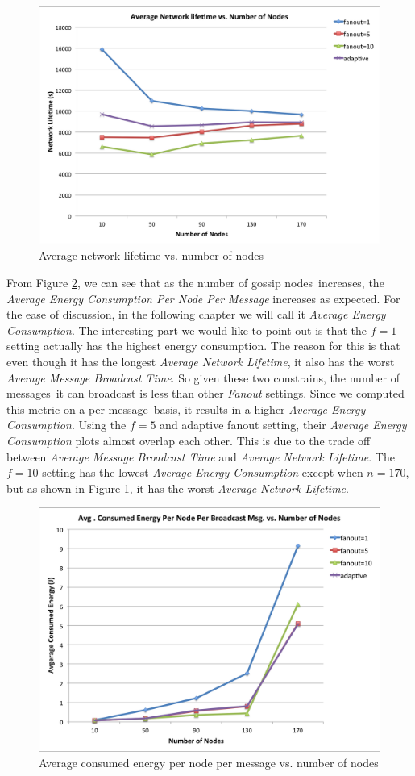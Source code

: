 \documentclass[onehalf,11pt]{beavtex}
\newcommand{\msgs}{messages}
\newcommand{\msg}{message}
\newcommand{\gns}{gossip nodes}
\newcommand{\ambt}{Average Message Broadcast Time}
\newcommand{\anl}{Average Network Lifetime}
\newcommand{\aec}{Average Energy Consumption}
\begin{document}
\begin{figure} 
	\centering
	\includegraphics[width=5.5in]{life.png}
	\caption{Average network lifetime vs. number of nodes}
	\label{fig:life}
\end{figure}

From Figure \ref{fig:energy}, we can see that as the number of \gns ~increases, the \emph{Average Energy Consumption Per Node Per Message} increases as expected. For the ease of discussion, in the following chapter we will call it \emph{Average Energy Consumption}. The interesting part we would like to point out is that the $f=1$ setting actually has the highest energy consumption. The reason for this is that even though it has the longest \emph{\anl}, it also has the worst \emph{\ambt}. So given these two constrains, the number of \msgs ~it can broadcast is less than other \emph{Fanout} settings. Since we computed this metric on a per \msg ~basis, it results in a higher \emph{\aec}. Using the $f=5$ and adaptive fanout setting, their \emph{\aec} plots almost overlap each other. This is due to the trade off between \emph{\ambt} and \emph{\anl}. The $f=10$ setting has the lowest \emph{\aec} except when $n=170$, but as shown in Figure \ref{fig:life}, it has the worst \emph{\anl}. 

\begin{figure} 
	\centering
	\includegraphics[width=5.5in]{energy.png}
	\caption{Average consumed energy per node per message vs. number of nodes}
	\label{fig:energy}
\end{figure}
\end{document}
